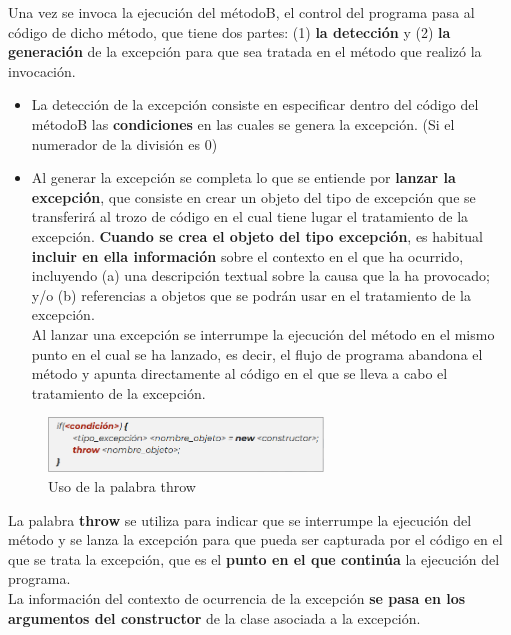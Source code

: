 \documentclass{article}
\begin{document}
Una vez se invoca la ejecución del métodoB, el control del programa pasa al código de dicho
método, que tiene dos partes: (1) \textbf{la detección} y (2) \textbf{la generación} de la excepción para que sea tratada en el método que realizó la invocación.
\begin{itemize}
    \item La detección de la excepción consiste en especificar dentro del código del métodoB las \textbf{condiciones} en las cuales se genera la excepción. (Si el numerador de la división es 0)
    
    \item Al generar la excepción se completa lo que se entiende por \textbf{lanzar la excepción}, que consiste en crear un objeto del tipo de excepción que se transferirá al trozo de código en el cual tiene lugar el tratamiento de la excepción. \textbf{Cuando se crea el objeto del tipo excepción}, es habitual \textbf{incluir en ella información} sobre el contexto en el que ha ocurrido, incluyendo (a) una descripción textual sobre la causa que la ha provocado; y/o (b) referencias a objetos que se podrán usar en el tratamiento de la excepción. \\
    Al lanzar una excepción se interrumpe la ejecución del método en el mismo punto en el cual se ha lanzado, es decir, el flujo de programa abandona el método y apunta directamente al código en el que se lleva a cabo el tratamiento de la excepción.
\end{itemize}

\newpage

\begin{figure}[h]
    \centering
    \includegraphics[width=0.65\textwidth]{img-t7/img_029_46.png}
    \caption{Uso de la palabra throw}
\end{figure}

La palabra \textbf{throw} se utiliza para indicar que se interrumpe la ejecución del método y se lanza la excepción para que pueda ser capturada por el código en el que se trata la excepción, que es el \textbf{punto en el que continúa} la ejecución del programa. \\
La información del contexto de ocurrencia de la excepción \textbf{se pasa en los argumentos del constructor} de la clase asociada a la excepción.
\end{document}
